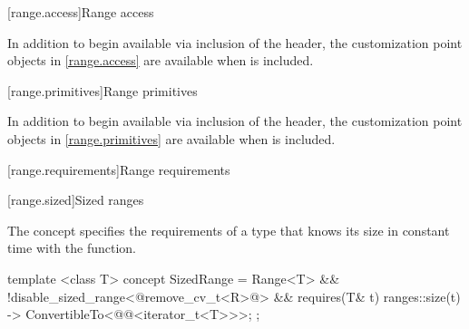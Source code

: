 
[range.access]{Range access}

\begin{addedblock}
\pnum
In addition to begin available via inclusion of the  header,
the customization point objects in \ref{range.access} are available when
 is included.
\end{addedblock}


[range.primitives]{Range primitives}

\begin{addedblock}
\pnum
In addition to begin available via inclusion of the  header,
the customization point objects in \ref{range.primitives} are available when
 is included.
\end{addedblock}


[range.requirements]{Range requirements}

\setcounter{subsection}{2}
[range.sized]{Sized ranges}

\pnum
The  concept specifies the requirements
of a  type that knows its size in constant time with the
 function.

\begin{itemdecl}
template <class T>
concept SizedRange =
  Range<T> &&
  !disable_sized_range<@remove_cv_t<R>\removed{>}@> &&
  requires(T& t) {
    { ranges::size(t) } -> ConvertibleTo<@@<iterator_t<T>>>;
  };
\end{itemdecl}

